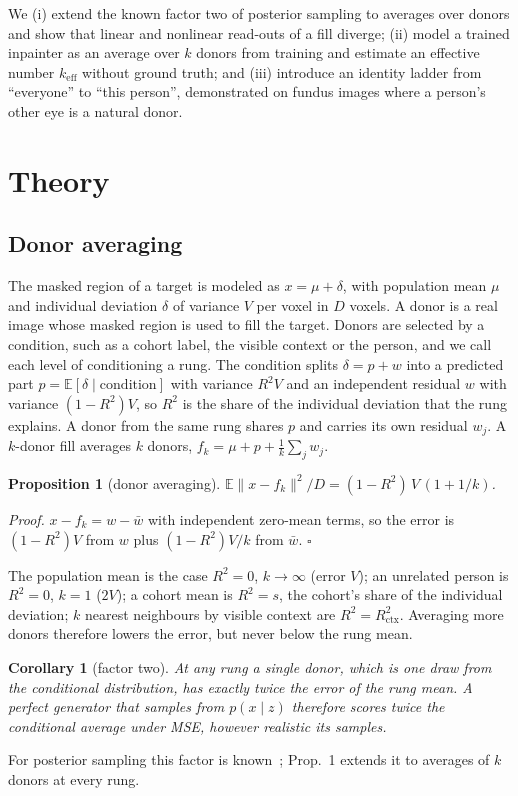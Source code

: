 \documentclass{article}
\newtheorem{prop}{Proposition}
\newtheorem{cor}{Corollary}
\begin{document}
We (i) extend the known factor two of posterior sampling to averages over donors and show that linear and nonlinear read-outs of a fill diverge; (ii) model a trained inpainter as an average over $k$ donors from training and estimate an effective number $k_{\mathrm{eff}}$ without ground truth; and (iii) introduce an identity ladder from ``everyone'' to ``this person'', demonstrated on fundus images where a person's other eye is a natural donor.

\section{Theory}
\label{sec:theory}
\subsection{Donor averaging}
The masked region of a target is modeled as $x=\mu+\delta$, with population mean $\mu$ and individual deviation $\delta$ of variance $V$ per voxel in $D$ voxels.
A donor is a real image whose masked region is used to fill the target.
Donors are selected by a condition, such as a cohort label, the visible context or the person, and we call each level of conditioning a rung.
The condition splits $\delta=p+w$ into a predicted part $p=\mathbb{E}[\delta\mid\text{condition}]$ with variance $R^2V$ and an independent residual $w$ with variance $(1-R^2)V$, so $R^2$ is the share of the individual deviation that the rung explains.
A donor from the same rung shares $p$ and carries its own residual $w_j$.
A $k$-donor fill averages $k$ donors, $f_k=\mu+p+\tfrac1k\sum_j w_j$.

\begin{prop}[donor averaging]
$\mathbb{E}\|x-f_k\|^2/D=(1-R^2)\,V\,(1+1/k)$.
\end{prop}
\noindent\emph{Proof.} $x-f_k=w-\bar w$ with independent zero-mean terms, so the error is $(1-R^2)V$ from $w$ plus $(1-R^2)V/k$ from $\bar w$. $\square$

\noindent The population mean is the case $R^2=0$, $k\to\infty$ (error $V$); an unrelated person is $R^2=0$, $k=1$ ($2V$); a cohort mean is $R^2=s$, the cohort's share of the individual deviation; $k$ nearest neighbours by visible context are $R^2=R^2_{\mathrm{ctx}}$.
Averaging more donors therefore lowers the error, but never below the rung mean.

\begin{cor}[factor two]
At any rung a single donor, which is one draw from the conditional distribution, has exactly twice the error of the rung mean.
A perfect generator that samples from $p(x\mid z)$ therefore scores twice the conditional average under MSE, however realistic its samples.
\end{cor}
\noindent For posterior sampling this factor is known~\cite{blau2018,ohayon2025}; Prop.~1 extends it to averages of $k$ donors at every rung.
\end{document}
